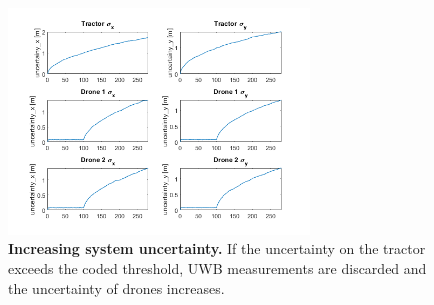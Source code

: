 \documentclass[letterpaper,twocolumn,10pt]{article}
\begin{document}
\begin{figure}[p]
    \centering
     \includegraphics[width=8cm]{images/noGNSS_high_noise_uncertainties.png}
     \caption{\textbf{Increasing system uncertainty.} If the uncertainty on the tractor exceeds the coded threshold, UWB measurements are discarded and the uncertainty of drones increases.}
    \label{fig:4}
\end{figure}
\end{document}
